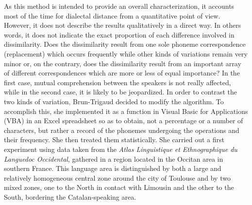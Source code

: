 \documentclass[output=paper]{LSP/langsci}
\begin{document}
As this method is intended to provide an overall characterization, it accounts most of the time for dialectal distance from a quantitative point of view. However, it does not describe the results qualitatively in a direct way. In others words, it does not indicate the exact proportion of each difference involved in dissimilarity. Does the dissimilarity result from one sole phoneme correspondence (replacement) which occurs frequently while other kinds of variations remain very minor or, on the contrary, does the dissimilarity result from an important array of different correspondences which are more or less of equal importance? In the first case, mutual comprehension between the speakers is not really affected, while in the second case, it is likely to be jeopardized. In order to contrast the two kinds of variation, Brun-Trigaud decided to modify the algorithm. To accomplish this, she implemented it as a  function in Visual Basic for Applications (VBA) in an Excel spreadsheet so as to obtain, not a percentage or a number of characters, but rather a record of the phonemes undergoing the operations and their frequency. She then treated them statistically. She carried out a first experiment \citep{brun-trigaud_usage_2014} using data taken from the \textit{Atlas Linguistique et Ethnographique du Languedoc Occidental}, gathered in a region located in the Occitan area in southern France. This language area is distinguished by both a large and relatively homogeneous central zone around the city of Toulouse and by two mixed zones, one to the North in contact with Limousin and the other to the South, bordering the Catalan-speaking area.

\begin{table}
\caption{An example of a qualitative measurement between 2 locations of enquiry for Occitan}
\label{tab:2}
\end{table}
\end{document}
